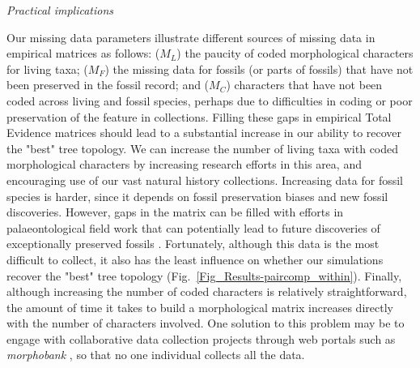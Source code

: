 \documentclass[12pt,letterpaper]{article}
\renewcommand{\subsection}[1]{%
\bigskip
\begin{center}
\begin{large}
\normalfont\itshape #1
\end{large}
\end{center}}
\begin{document}
\subsection{Practical implications}
Our missing data parameters illustrate different sources of missing data in empirical matrices as follows: ($M_{L}$) the paucity of coded morphological characters for living taxa; ($M_{F}$) the missing data for fossils (or parts of fossils) that have not been preserved in the fossil record; and ($M_{C}$) characters that have not been coded across living and fossil species, perhaps due to difficulties in coding or poor preservation of the feature in collections. Filling these gaps in empirical Total Evidence matrices should lead to a substantial increase in our ability to recover the "best" tree topology. We can increase the number of living taxa with coded morphological characters by increasing research efforts in this area, and encouraging use of our vast natural history collections. Increasing data for fossil species is harder, since it depends on fossil preservation biases and new fossil discoveries. However, gaps in the matrix can be filled with efforts in palaeontological field work that can potentially lead to future discoveries of exceptionally preserved fossils \citep[e.g.][]{nithe2013}. Fortunately, although this data is the most difficult to collect, it also has the least influence on whether our simulations recover the "best" tree topology (Fig.~\ref{Fig_Results-paircomp_within}). Finally, although increasing the number of coded characters is relatively straightforward, the amount of time it takes to build a morphological matrix increases directly with the number of characters involved. One solution to this problem may be to engage with collaborative data collection projects through web portals such as \textit{morphobank} \citep{morphobank}, so that no one individual collects all the data.
\end{document}

